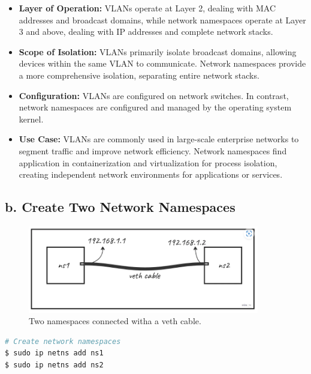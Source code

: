 \documentclass{report}
\begin{document}
\begin{itemize}
  \item \textbf{Layer of Operation:} VLANs operate at Layer 2, dealing with MAC addresses and broadcast domains, while network namespaces operate at Layer 3 and above, dealing with IP addresses and complete network stacks.
  
  \item \textbf{Scope of Isolation:} VLANs primarily isolate broadcast domains, allowing devices within the same VLAN to communicate. Network namespaces provide a more comprehensive isolation, separating entire network stacks.
  
  \item \textbf{Configuration:} VLANs are configured on network switches. In contrast, network namespaces are configured and managed by the operating system kernel.
  
  \item \textbf{Use Case:} VLANs are commonly used in large-scale enterprise networks to segment traffic and improve network efficiency. Network namespaces find application in containerization and virtualization for process isolation, creating independent network environments for applications or services.\cite{9}
\end{itemize}

\subsection*{b. Create Two Network Namespaces}

\begin{figure}[h] 
  \centering 
  \includegraphics[width=0.9\textwidth]{24.png} 
  \captionsetup{labelformat=empty}
  \caption{Two namespaces connected witha a veth cable.\cite{9}}
\end{figure} 


\begin{lstlisting}[language=bash]
# Create network namespaces
$ sudo ip netns add ns1
$ sudo ip netns add ns2
\end{lstlisting}
\end{document}

